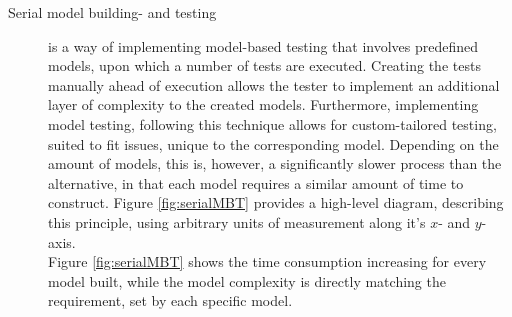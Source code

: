 \begin{description}
	\item[Serial model building- and testing]
	is a way of implementing model-based testing that involves predefined models, upon which a number of tests are executed. Creating the tests manually ahead of execution allows the tester to implement an additional layer of complexity to the created models. Furthermore, implementing model testing, following this technique allows for custom-tailored testing, suited to fit issues, unique to the corresponding model. Depending on the amount of models, this is, however, a significantly slower process than the alternative, in that each model requires a similar amount of time to construct. Figure \ref{fig:serialMBT} provides a high-level diagram, describing this principle, using arbitrary units of measurement along it's $x$- and $y$-axis.\\
%
%			
%			
%
	Figure \ref{fig:serialMBT} shows the time consumption increasing for every model built, while the model complexity is directly matching the requirement, set by each specific model.

\end{description}
